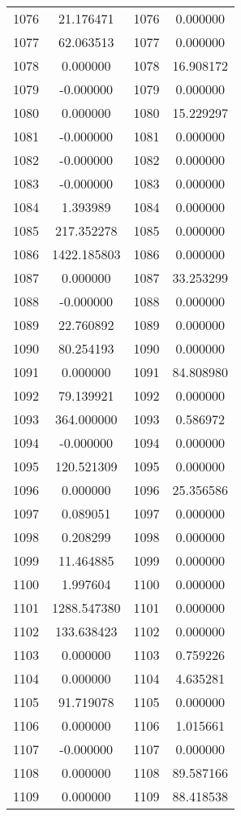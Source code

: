 \documentclass[12pt]{article}
\begin{document}
\begin{longtable}{@{}cccc@{}}
1076 & 21.176471 & 1076 & 0.000000 \\
1077 & 62.063513 & 1077 & 0.000000 \\
1078 & 0.000000 & 1078 & 16.908172 \\
1079 & -0.000000 & 1079 & 0.000000 \\
1080 & 0.000000 & 1080 & 15.229297 \\
1081 & -0.000000 & 1081 & 0.000000 \\
1082 & -0.000000 & 1082 & 0.000000 \\
1083 & -0.000000 & 1083 & 0.000000 \\
1084 & 1.393989 & 1084 & 0.000000 \\
1085 & 217.352278 & 1085 & 0.000000 \\
1086 & 1422.185803 & 1086 & 0.000000 \\
1087 & 0.000000 & 1087 & 33.253299 \\
1088 & -0.000000 & 1088 & 0.000000 \\
1089 & 22.760892 & 1089 & 0.000000 \\
1090 & 80.254193 & 1090 & 0.000000 \\
1091 & 0.000000 & 1091 & 84.808980 \\
1092 & 79.139921 & 1092 & 0.000000 \\
1093 & 364.000000 & 1093 & 0.586972 \\
1094 & -0.000000 & 1094 & 0.000000 \\
1095 & 120.521309 & 1095 & 0.000000 \\
1096 & 0.000000 & 1096 & 25.356586 \\
1097 & 0.089051 & 1097 & 0.000000 \\
1098 & 0.208299 & 1098 & 0.000000 \\
1099 & 11.464885 & 1099 & 0.000000 \\
1100 & 1.997604 & 1100 & 0.000000 \\
1101 & 1288.547380 & 1101 & 0.000000 \\
1102 & 133.638423 & 1102 & 0.000000 \\
1103 & 0.000000 & 1103 & 0.759226 \\
1104 & 0.000000 & 1104 & 4.635281 \\
1105 & 91.719078 & 1105 & 0.000000 \\
1106 & 0.000000 & 1106 & 1.015661 \\
1107 & -0.000000 & 1107 & 0.000000 \\
1108 & 0.000000 & 1108 & 89.587166 \\
1109 & 0.000000 & 1109 & 88.418538 \\

\end{longtable}
\end{document}
